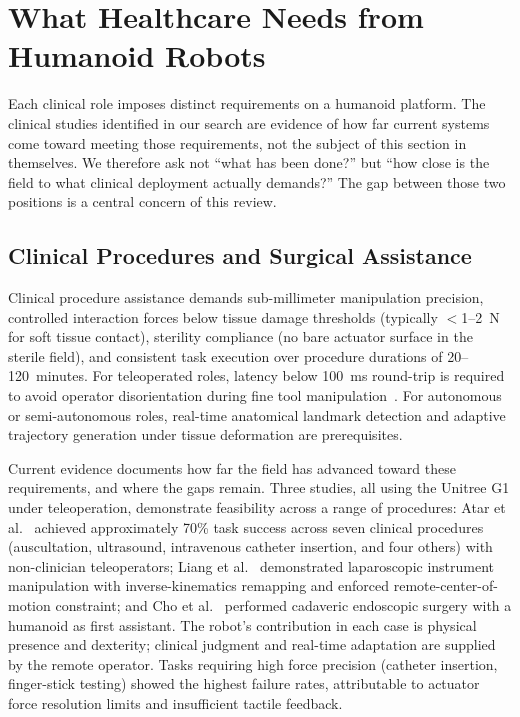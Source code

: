 ﻿%
\section{What Healthcare Needs from Humanoid Robots}
\label{sec:applications}

Each clinical role imposes distinct requirements on a humanoid platform. The
clinical studies identified in our search are evidence of how far current systems
come toward meeting those requirements, not the subject of this section in
themselves. We therefore ask not ``what has been done?'' but ``how close is the
field to what clinical deployment actually demands?'' The gap between those two
positions is a central concern of this review.

\subsection{Clinical Procedures and Surgical Assistance}
\label{sec:procedures}

Clinical procedure assistance demands sub-millimeter manipulation precision,
controlled interaction forces below tissue damage thresholds (typically
$<$1--2~N for soft tissue contact), sterility compliance (no bare actuator
surface in the sterile field), and consistent task execution over procedure
durations of 20--120~minutes. For teleoperated roles, latency below 100~ms
round-trip is required to avoid operator disorientation during fine tool
manipulation~\cite{lum2009latency,avgousti2016medical,motiwala2025telesurgery}. For autonomous or semi-autonomous roles, real-time anatomical
landmark detection and adaptive trajectory generation under tissue deformation
are prerequisites.

Current evidence documents how far the field has advanced toward these
requirements, and where the gaps remain. Three studies, all using the Unitree
G1 under teleoperation, demonstrate feasibility across a range of procedures:
Atar et al.~\cite{atar2025humanoids} achieved approximately 70\% task success
across seven clinical procedures (auscultation, ultrasound, intravenous
catheter insertion, and four others) with non-clinician teleoperators; Liang et
al.~\cite{liang2025lapsurgie} demonstrated laparoscopic instrument manipulation
with inverse-kinematics remapping and enforced remote-center-of-motion
constraint; and Cho et al.~\cite{cho2026humanoid} performed cadaveric
endoscopic surgery with a humanoid as first assistant. The robot's contribution
in each case is physical presence and dexterity; clinical judgment and
real-time adaptation are supplied by the remote operator. Tasks requiring high
force precision (catheter insertion, finger-stick testing) showed the highest
failure rates, attributable to actuator force resolution limits and insufficient
tactile feedback.

